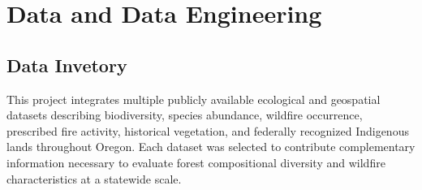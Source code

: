 \documentclass[
  letterpaper,
  DIV=11,
  numbers=noendperiod]{scrartcl}
\begin{document}
\section{Data and Data Engineering}\label{data-and-data-engineering}

\subsection{Data Invetory}\label{data-invetory}

This project integrates multiple publicly available ecological and
geospatial datasets describing biodiversity, species abundance, wildfire
occurrence, prescribed fire activity, historical vegetation, and
federally recognized Indigenous lands throughout Oregon. Each dataset
was selected to contribute complementary information necessary to
evaluate forest compositional diversity and wildfire characteristics at
a statewide scale.
\end{document}
